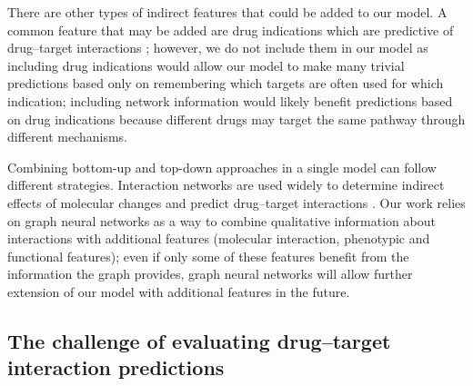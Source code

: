 \documentclass{bioinfo}
\renewcommand{\cite}{\citep}
\begin{document}
There are other types of indirect features that could be added to our
model. A common feature that may be added are drug indications which are
predictive of drug--target interactions \cite{}; however, we do
not include them in our model as including drug indications would
allow our model to make many trivial predictions based only on
remembering which targets are often used for which indication;
including network information would likely benefit predictions based
on drug indications because different drugs may target the same
pathway through different mechanisms.

Combining bottom-up and top-down approaches in a single model can
follow different strategies. Interaction networks are used widely to
determine indirect effects of molecular changes \cite{} and predict
drug--target interactions \cite{}. Our work relies on graph neural
networks as a way to combine qualitative information about
interactions with additional features (molecular interaction,
phenotypic and functional features); even if only some of these
features benefit from the information the graph provides, graph neural
networks will allow further extension of our model with additional
features in the future.










\subsection{The challenge of evaluating drug--target interaction
  predictions}
\end{document}
